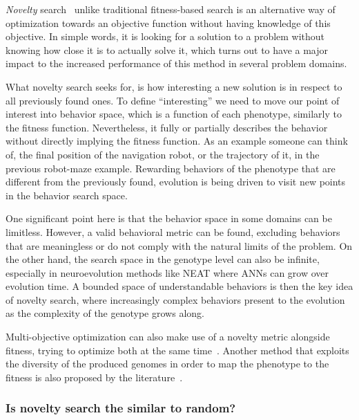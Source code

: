 \emph{Novelty} search~\citep{lehman2008exploiting,lehman2011abandoning,lehman2010revising, risi2009novelty} unlike traditional fitness-based search is an alternative way of optimization towards an objective function without having knowledge of this objective. In simple words, it is looking for a solution to a problem without knowing how close it is to actually solve it, which turns out to have a major impact to the increased performance of this method in several problem domains. 

What novelty search seeks for, is how interesting a new solution is in respect to all previously found ones. To define ``interesting'' we need to move our point of interest into behavior space, which is a function of each phenotype, similarly to the fitness function. Nevertheless, it fully or partially describes the behavior without directly implying the fitness function. As an example someone can think of, the final position of the navigation robot, or the trajectory of it, in the previous robot-maze example. Rewarding behaviors of the phenotype that are different from the previously found, evolution is being driven to visit new points in the behavior search space.

One significant point here is that the behavior space in some domains can be limitless. However, a valid behavioral metric can be found, excluding behaviors that are meaningless or do not comply with the natural limits of the problem. On the other hand, the search space in the genotype level can also be infinite, especially in neuroevolution methods like NEAT where ANNs can grow over evolution time. A bounded space of understandable behaviors is then the key idea of novelty search, where increasingly complex behaviors present to the evolution as the complexity of the genotype grows along.

Multi-objective optimization can also make use of a novelty metric alongside fitness, trying to optimize both at the same time~\citep{mouret2011novelty}. Another method that exploits the diversity of the produced genomes in order to map the phenotype to the fitness is also proposed by the literature~\citep{mouret2012algorithm}.

\subsubsection*{Is novelty search the similar to random?}

